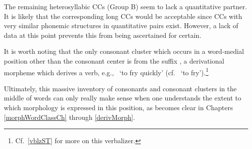 The remaining heterosyllabic CCs (Group B) seem to lack a quantitative partner. It is likely that the corresponding long CCs  would be acceptable since CCs with very similar phonemic structures in quantitative pairs exist. However, a lack of data at this point prevents this from being ascertained for certain.

It is worth noting that the only consonant cluster which occurs in a word-medial position other than the consonant center is  from the suffix \mbox{,} a derivational morpheme
which derives a verb, e.g.,~ ‘to fry quickly’ (cf.~{} ‘to fry’).\footnote{Cf.~\SEC\ref{vblzST} for more on this verbalizer.} %

Ultimately, this massive inventory of consonants and consonant clusters in the middle of words can only really make sense when one understands the extent to which morphology is expressed in this position, as becomes clear in Chapters \ref{morphWordClassCh} through \ref{derivMorph}. 



\FB

